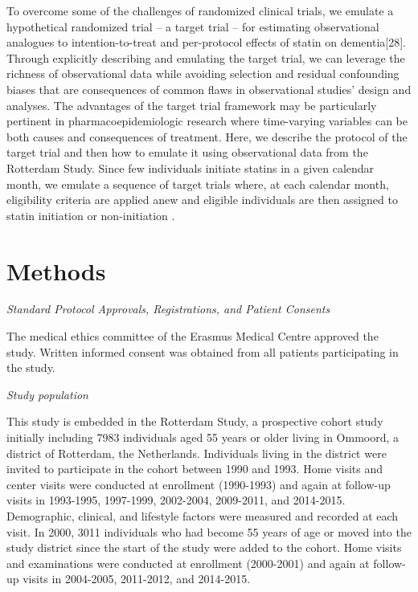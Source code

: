 \documentclass[
]{book}
\begin{document}
To overcome some of the challenges of randomized clinical trials, we emulate a hypothetical randomized trial -- a target trial -- for estimating observational analogues to intention-to-treat and per-protocol effects of statin on dementia{[}28{]}. Through explicitly describing and emulating the target trial, we can leverage the richness of observational data while avoiding selection and residual confounding biases that are consequences of common flaws in observational studies' design and analyses. The advantages of the target trial framework may be particularly pertinent in pharmacoepidemiologic research where time-varying variables can be both causes and consequences of treatment. Here, we describe the protocol of the target trial and then how to emulate it using observational data from the Rotterdam Study. Since few individuals initiate statins in a given calendar month, we emulate a sequence of target trials where, at each calendar month, eligibility criteria are applied anew and eligible individuals are then assigned to statin initiation or non-initiation \autocite{danaei2013,danaei2018}.

\hypertarget{methods}{%
\section{Methods}\label{methods}}

\emph{Standard Protocol Approvals, Registrations, and Patient Consents}

The medical ethics committee of the Erasmus Medical Centre approved the study. Written
informed consent was obtained from all patients participating in the study.

\emph{Study population}

This study is embedded in the Rotterdam Study, a prospective cohort study initially including 7983 individuals aged 55 years or older living in Ommoord, a district of Rotterdam, the Netherlands\autocite{hofman2015}. Individuals living in the district were invited to participate in the cohort between 1990 and 1993. Home visits and center visits were conducted at enrollment (1990-1993) and again at follow-up visits in 1993-1995, 1997-1999, 2002-2004, 2009-2011, and 2014-2015. Demographic, clinical, and lifestyle factors were measured and recorded at each visit. In 2000, 3011 individuals who had become 55 years of age or moved into the study district since the start of the study were added to the cohort. Home visits and examinations were conducted at enrollment (2000-2001) and again at follow-up visits in 2004-2005, 2011-2012, and 2014-2015.
\end{document}
